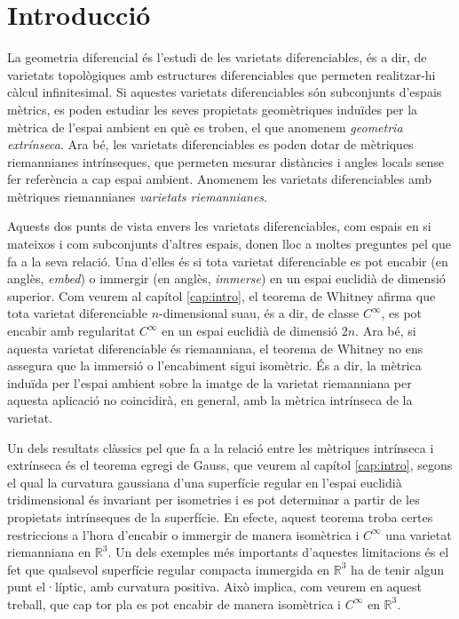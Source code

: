 \chapter{Introducci\'o}

La geometria diferencial és l'estudi de les varietats diferenciables, és a dir, de varietats topològiques amb estructures diferenciables que permeten realitzar-hi càlcul infinitesimal. Si aquestes varietats diferenciables són subconjunts d'espais mètrics, es poden estudiar les seves propietats geomètriques induïdes per la mètrica de l'espai ambient en què es troben, el que anomenem \textit{geometria extrínseca}. Ara bé, les varietats diferenciables es poden dotar de mètriques riemannianes intrínseques, que permeten mesurar distàncies i angles locals sense fer referència a cap espai ambient. Anomenem les varietats diferenciables amb mètriques riemannianes \textit{varietats riemannianes}.

Aquests dos punts de vista envers les varietats diferenciables, com espais en si mateixos i com subconjunts d'altres espais, donen lloc a moltes preguntes pel que fa a la seva relació. Una d'elles és si tota varietat diferenciable es pot encabir (en anglès, \textit{embed}) o immergir (en anglès, \textit{immerse}) en un espai euclidià de dimensió superior. Com veurem al capítol \ref{cap:intro}, el teorema de Whitney afirma que tota varietat diferenciable $n$-dimensional suau, és a dir, de classe $C^\infty$, es pot encabir amb regularitat $C^\infty$ en un espai euclidià de dimensió $2n$. Ara bé, si aquesta varietat diferenciable és riemanniana, el teorema de Whitney no ens assegura que la immersió o l'encabiment sigui isomètric. És a dir, la mètrica induïda per l'espai ambient sobre la imatge de la varietat riemanniana per aquesta aplicació no coincidirà, en general, amb la mètrica intrínseca de la varietat. 

Un dels resultats clàssics pel que fa a la relació entre les mètriques intrínseca i extrínseca és el teorema egregi de Gauss, que veurem al capítol \ref{cap:intro}, segons el qual la curvatura gaussiana d'una superfície regular en l'espai euclidià tridimensional és invariant per isometries i es pot determinar a partir de les propietats intrínseques de la superfície. En efecte, aquest teorema troba certes restriccions a l'hora d'encabir o immergir de manera isomètrica i $C^\infty$ una varietat riemanniana en $\mathbb R^3$. Un dels exemples més importants d'aquestes limitacions és el fet que qualsevol superfície regular compacta immergida en $\mathbb R^3$ ha de tenir algun punt el·líptic, amb curvatura positiva. Això implica, com veurem en aquest treball, que cap tor pla es pot encabir de manera isomètrica i $C^\infty$ en $\mathbb R^3$.

